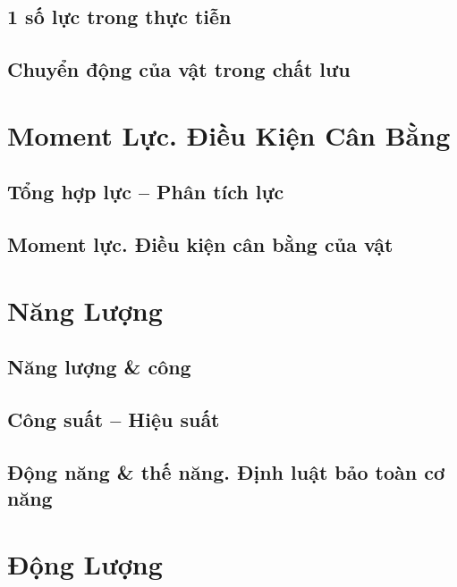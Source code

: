 \documentclass{article}
\numberwithin{equation}{section}
\begin{document}
\subsection{1 số lực trong thực tiễn}

\subsection{Chuyển động của vật trong chất lưu}


\section{Moment Lực. Điều Kiện Cân Bằng}

\subsection{Tổng hợp lực -- Phân tích lực}

\subsection{Moment lực. Điều kiện cân bằng của vật}


\section{Năng Lượng}

\subsection{Năng lượng \& công}

\subsection{Công suất -- Hiệu suất}

\subsection{Động năng \& thế năng. Định luật bảo toàn cơ năng}


\section{Động Lượng}
\end{document}
